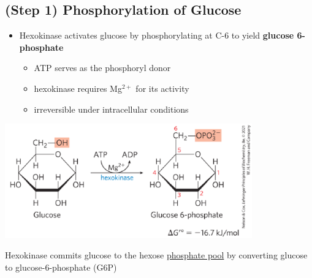 \documentclass[10pt]{article}
\begin{document}
\subsection*{(Step 1) Phosphorylation of Glucose}
\begin{itemize}
	\item Hexokinase activates glucose by phosphorylating at C-6 to yield \textbf{glucose 6-phosphate}
	\begin{itemize}
        \item ATP serves as the phosphoryl donor
        \item hexokinase requires Mg$^{2+}$ for its activity
        \item irreversible under intracellular conditions
    \end{itemize}
\end{itemize}
\begin{center} 
	\includegraphics*[width=0.8\textwidth]{L1_1.png}
\end{center}
Hexokinase commits glucose to the hexose \underline{phosphate pool} by converting glucose to glucose-6-phosphate (G6P)
\end{document}
